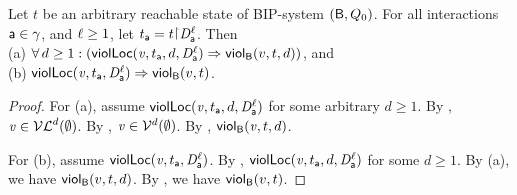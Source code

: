 \begin{proposition}
\label{prop:locScViol-implies-scViol}
\label{prop:lviol-implies-viol}
Let $t$ be an arbitrary reachable state of BIP-system $(\B, Q_0)$.
For all interactions $\act \in \gamma$, and $\l \ge 1$, let $t_\act = t \pj \dsk{\act}{\l}$.
Then\\
\ind (a) $\fa d \ge 1:  (\scVLd{\ndv}{d}{t_\act}{\act}{\l} \imp \scVd{v}{d}{t}) $, and\\
\ind (b) $\scVL{\ndv}{t_\act}{\act}{\l} \imp \scV{v}{t}$.
\end{proposition}
%
\begin{proof}
For (a), assume $\scVLd{\ndv}{d}{t_\act}{\act}{\l}$ for some arbitrary $d \ge 1$.
By ,  $\ndv \in \lVFs^{d} (\ewfg)$.
By ,  $\ndv  \in \VFs^{d} (\ewfg)$.
By , $\scVd{\ndv}{d}{t}$.

For (b), assume $\scVL{\ndv}{t_\act}{\act}{\l}$. By ,
$\scVLd{\ndv}{d}{t_\act}{\act}{\l}$ for some $d \ge 1$. By (a), we have $\scVd{v}{d}{t}$.
By , we have $\scV{v}{t}$.
\end{proof}
